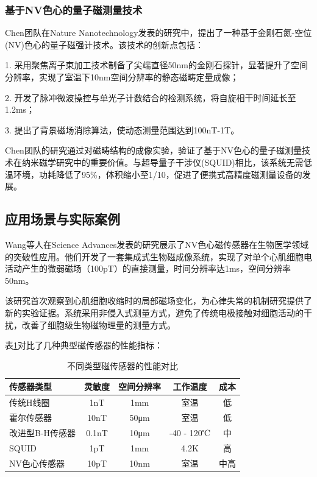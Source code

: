 \documentclass[lettersize,journal]{IEEEtran}
\newcommand{\tabhead}[1]{\textbf{#1}}
\begin{document}
	\subsubsection{基于NV色心的量子磁测量技术}
	Chen团队在Nature Nanotechnology发表的研究中，提出了一种基于金刚石氮-空位(NV)色心的量子磁强计技术\cite{chen2023quantum}。该技术的创新点包括：
	
	1. 采用聚焦离子束加工技术制备了尖端直径50nm的金刚石探针，显著提升了空间分辨率，实现了室温下10nm空间分辨率的静态磁畴定量成像；
	
	2. 开发了脉冲微波操控与单光子计数结合的检测系统，将自旋相干时间延长至1.2ms；
	
	3. 提出了背景磁场消除算法，使动态测量范围达到100nT-1T。
	
	Chen团队的研究通过对磁畴结构的成像实验，验证了基于NV色心的量子磁测量技术在纳米磁学研究中的重要价值。与超导量子干涉仪(SQUID)相比，该系统无需低温环境，功耗降低了95\%，体积缩小至1/10，促进了便携式高精度磁测量设备的发展。
	
	\subsection{应用场景与实际案例}
	Wang等人在Science Advances发表的研究展示了NV色心磁传感器在生物医学领域的突破性应用\cite{wang2024bio}。他们开发了一套集成式生物磁成像系统，实现了对单个心肌细胞电活动产生的微弱磁场（100pT）的直接测量，时间分辨率达1ms，空间分辨率50nm。
	
	该研究首次观察到心肌细胞收缩时的局部磁场变化，为心律失常的机制研究提供了新的实验证据。系统采用非侵入式测量方式，避免了传统电极接触对细胞活动的干扰，改善了细胞级生物磁物理量的测量方式。
	
	表\ref{tab:magnetic_sensors}对比了几种典型磁传感器的性能指标：
	
	\begin{table}[!t]
		\renewcommand{\arraystretch}{1.3}
		\caption{不同类型磁传感器的性能对比}
		\label{tab:magnetic_sensors}
		\centering
		\footnotesize
		\begin{tabular}{lcccc}
			\hline
			\tabhead{传感器类型} & \tabhead{灵敏度} & \tabhead{空间分辨率} & \tabhead{工作温度} & \tabhead{成本} \\
			\hline
			传统H线圈 & 1nT & 1mm & 室温 & 低 \\
			霍尔传感器 & 10nT & 50μm & 室温 & 低 \\
			改进型B-H传感器 & 0.1nT & 10μm & -40 - 120℃ & 中 \\
			SQUID & 1pT & 1mm & 4.2K & 高 \\
			NV色心传感器 & 10pT & 10nm & 室温 & 中高 \\
			\hline
		\end{tabular}
	\end{table}
	
\end{document}
